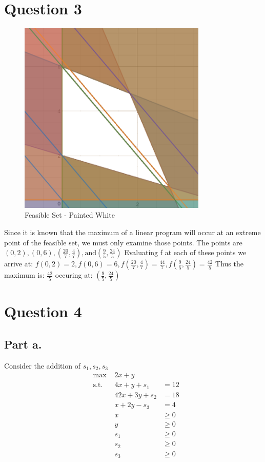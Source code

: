 \documentclass[12pt, letterpaper]{paper}
\begin{document}
\section*{Question 3}
\begin{figure}[H]
\centering
\includegraphics[width=0.8\textwidth]{q3.png}
\caption{ Feasible Set - Painted White }
\end{figure}
Since it is known that the maximum of a linear program will occur at an extreme point of the feasible set, we must only examine those points.
The points are $(0,2), (0,6), (\frac{20}{7},\frac{4}{7}), \text{and} (\frac{9}{5}, \frac{24}{5} )$ Evaluating f at each of these points we arrive at:
$f(0,2) = 2, f(0,6) = 6, f(\frac{20}{7},\frac{4}{7}) = \frac{44}{7} , f(\frac{9}{5}, \frac{24}{5} ) = \frac{42}{5}$ Thus the maximum is: $\frac{42}{5}$ occuring at: $(\frac{9}{5}, \frac{24}{5} )$ 



\section*{Question 4}
\subsection* {Part a. }

Consider the addition of $s_1, s_2, s_3$	
\begin{equation*}
\begin{alignedat}{3}
&\text{max }&2x + y&\\
&\text{s.t. } &4x + y + s_1&= 12 \\
&  &42x + 3y + s_2& = 18 \\
& &x + 2y - s_3 &= 	4\\
& & x &\geq 0\\
& & y &\geq 0\\
& & s_1 &\geq 0\\
& & s_2 &\geq 0\\
& & s_3 &\geq 0\\
\end{alignedat}
\end{equation*}
\end{document}
